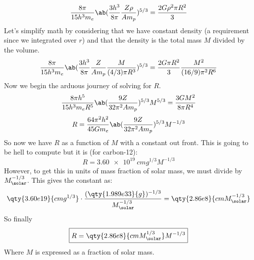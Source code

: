 \begin{equation}
    \frac{8\pi}{15h^3m_e}\ab(\frac{3h^3}{8\pi}\frac{Z\rho}{Am_p})^{5/3} = \frac{2G\rho^2\pi R^2}{3}
\end{equation}
Let's simplify math by considering that we have constant density (a requirement since we integrated over $r$) and that the density is the total mass $M$ divided by the volume.
\begin{equation}
    \frac{8\pi}{15h^3m_e} \ab(\frac{3h^3}{8\pi}\frac{Z}{Am_p} \frac{M}{(4/3)\pi R^3})^{5/3} = \frac{2G\pi R^2}{3}\frac{M^2}{(16/9)\pi^2 R^6}
\end{equation}
Now we begin the arduous journey of solving for $R$.
\begin{equation}
    \frac{8\pi h^5}{15h^3m_e R^5} \ab(\frac{9Z}{32\pi^2Am_p})^{5/3} M^{5/3} = \frac{3GM^2}{8\pi R^4}
\end{equation}
\begin{equation}
    R = \frac{64\pi^2h^2}{45Gm_e}\ab(\frac{9Z}{32\pi^2Am_p})^{5/3} M^{-1/3}
\end{equation}
So now we have $R$ as a function of $M$ with a constant out front. This is going to be hell to compute but it is (for carbon-12):
\begin{equation}
    R = \qty{3.60e19}{cm g^{1/3}} M^{-1/3}
\end{equation}
However, to get this in units of mass fraction of solar mass, we must divide by $M_\solar^{-1/3}$. This gives the constant as:
\begin{equation}
    \qty{3.60e19}{cm g^{1/3}} \cdot \frac{(\qty{1.989e33}{g})^{-1/3}}{M_\solar^{-1/3}} = \qty{2.86e8}{cm M_\solar^{-1/3}}
\end{equation}
So finally
\begin{equation}
    \boxed{R = \qty{2.86e8}{cm M_\solar^{1/3}} M^{-1/3}}
\end{equation}
Where $M$ is expressed as a fraction of solar mass.